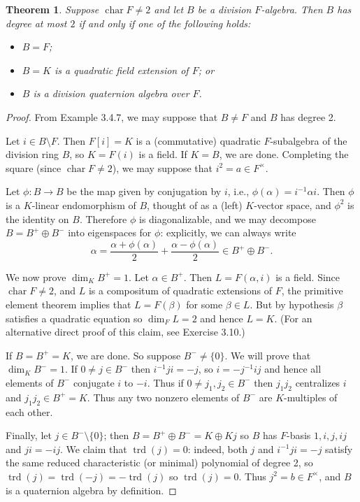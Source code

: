 \documentclass{article}
\newtheorem{theorem}{Theorem}[section]
\theoremstyle{definition}
\begin{document}
\begin{theorem}
\label{thm:3.5.1}
Suppose $\operatorname{char} F \neq 2$ and let $B$ be a division $F$-algebra. Then $B$ has degree at most $2$ if and only if one of the following holds:
\begin{itemize}
  \item[(i)] $B = F$;
  \item[(ii)] $B = K$ is a quadratic field extension of $F$; or
  \item[(iii)] $B$ is a division quaternion algebra over $F$.
\end{itemize}
\end{theorem}

\begin{proof}
From Example 3.4.7, we may suppose that $B \neq F$ and $B$ has degree 2.

Let $i \in B \setminus F$. Then $F[i] = K$ is a (commutative) quadratic $F$-subalgebra of the division ring $B$, so $K = F(i)$ is a field. If $K = B$, we are done. Completing the square (since $\operatorname{char} F \neq 2$), we may suppose that $i^2 = a \in F^\times$.

Let $\phi: B \to B$ be the map given by conjugation by $i$, i.e., $\phi(\alpha) = i^{-1}\alpha i$. Then $\phi$ is a $K$-linear endomorphism of $B$, thought of as a (left) $K$-vector space, and $\phi^2$ is the identity on $B$. Therefore $\phi$ is diagonalizable, and we may decompose $B = B^+ \oplus B^-$ into eigenspaces for $\phi$: explicitly, we can always write
$$\alpha = \frac{\alpha + \phi(\alpha)}{2} + \frac{\alpha - \phi(\alpha)}{2} \in B^+ \oplus B^-.$$

We now prove $\dim_K B^+ = 1$. Let $\alpha \in B^+$. Then $L = F(\alpha, i)$ is a field. Since $\operatorname{char} F \neq 2$, and $L$ is a compositum of quadratic extensions of $F$, the primitive element theorem implies that $L = F(\beta)$ for some $\beta \in L$. But by hypothesis $\beta$ satisfies a quadratic equation so $\dim_F L = 2$ and hence $L = K$. (For an alternative direct proof of this claim, see Exercise 3.10.)

If $B = B^+ = K$, we are done. So suppose $B^- \neq \{0\}$. We will prove that $\dim_K B^- = 1$. If $0 \neq j \in B^-$ then $i^{-1}ji = -j$, so $i = -j^{-1}ij$ and hence all elements of $B^-$ conjugate $i$ to $-i$. Thus if $0 \neq j_1, j_2 \in B^-$ then $j_1j_2$ centralizes $i$ and $j_1j_2 \in B^+ = K$. Thus any two nonzero elements of $B^-$ are $K$-multiples of each other.

Finally, let $j \in B^- \setminus \{0\}$; then $B = B^+ \oplus B^- = K \oplus Kj$ so $B$ has $F$-basis $1, i, j, ij$ and $ji = -ij$. We claim that $\operatorname{trd}(j) = 0$: indeed, both $j$ and $i^{-1}ji = -j$ satisfy the same reduced characteristic (or minimal) polynomial of degree 2, so $\operatorname{trd}(j) = \operatorname{trd}(-j) = -\operatorname{trd}(j)$ so $\operatorname{trd}(j) = 0$. Thus $j^2 = b \in F^\times$, and $B$ is a quaternion algebra by definition.
\end{proof}
\end{document}
